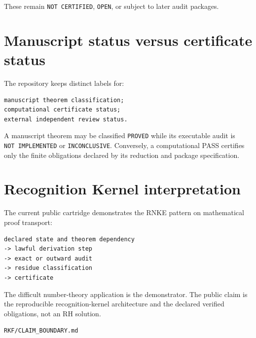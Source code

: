 These remain \texttt{NOT\ CERTIFIED}, \texttt{OPEN}, or subject to later audit packages.

\hypertarget{manuscript-status-versus-certificate-status}{%
\section{Manuscript status versus certificate status}\label{manuscript-status-versus-certificate-status}}

The repository keeps distinct labels for:

\begin{verbatim}
manuscript theorem classification;
computational certificate status;
external independent review status.
\end{verbatim}

A manuscript theorem may be classified \texttt{PROVED} while its executable audit is \texttt{NOT\ IMPLEMENTED} or \texttt{INCONCLUSIVE}. Conversely, a computational PASS certifies only the finite obligations declared by its reduction and package specification.

\hypertarget{recognition-kernel-interpretation}{%
\section{Recognition Kernel interpretation}\label{recognition-kernel-interpretation}}

The current public cartridge demonstrates the RNKE pattern on mathematical proof transport:

\begin{verbatim}
declared state and theorem dependency
-> lawful derivation step
-> exact or outward audit
-> residue classification
-> certificate
\end{verbatim}

The difficult number-theory application is the demonstrator. The public claim is the reproducible recognition-kernel architecture and the declared verified obligations, not an RH solution.

\begin{flushright}\small\texttt{RKF/CLAIM\_BOUNDARY.md}\end{flushright}
